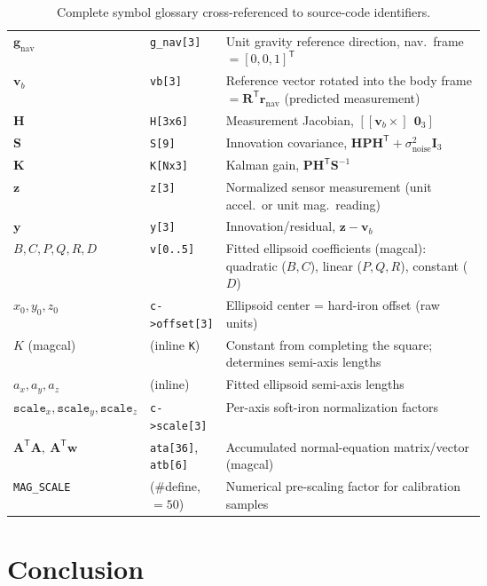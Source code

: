 \documentclass[11pt]{article}
\newcommand{\vect}[1]{\bm{#1}}
\newcommand{\mat}[1]{\bm{#1}}
\newcommand{\transpose}{^{\mathsf{T}}}
\newcommand{\skewm}[1]{\left[#1\times\right]}
\begin{document}
\begin{table}[H]
\begin{tabular}{@{}llp{0.62\linewidth}@{}}
$\vect g_{\text{nav}}$ & \texttt{g\_nav[3]} & Unit gravity reference direction, nav.\ frame $=[0,0,1]\transpose$ \\
$\vect v_b$ & \texttt{vb[3]} & Reference vector rotated into the body frame $=\mat R\transpose\vect r_{\text{nav}}$ (predicted measurement) \\
$\mat H$ & \texttt{H[3x6]} & Measurement Jacobian, $[\skewm{\vect v_b}\ \ \mat 0_3]$ \\
$\mat S$ & \texttt{S[9]} & Innovation covariance, $\mat H\mat P\mat H\transpose + \sigma_{\text{noise}}^2\mat I_3$ \\
$\mat K$ & \texttt{K[Nx3]} & Kalman gain, $\mat P\mat H\transpose\mat S^{-1}$ \\
$\vect z$ & \texttt{z[3]} & Normalized sensor measurement (unit accel.\ or unit mag.\ reading) \\
$\vect y$ & \texttt{y[3]} & Innovation/residual, $\vect z-\vect v_b$ \\
$B,C,P,Q,R,D$ & \texttt{v[0..5]} & Fitted ellipsoid coefficients (magcal): quadratic ($B,C$), linear ($P,Q,R$), constant ($D$) \\
$x_0,y_0,z_0$ & \texttt{c->offset[3]} & Ellipsoid center = hard-iron offset (raw units) \\
$K$ (magcal) & (inline \texttt{K}) & Constant from completing the square; determines semi-axis lengths \\
$a_x,a_y,a_z$ & (inline) & Fitted ellipsoid semi-axis lengths \\
$\texttt{scale}_x,\texttt{scale}_y,\texttt{scale}_z$ & \texttt{c->scale[3]} & Per-axis soft-iron normalization factors \\
$\mat A\transpose\mat A,\ \mat A\transpose\vect w$ & \texttt{ata[36]}, \texttt{atb[6]} & Accumulated normal-equation matrix/vector (magcal) \\
\texttt{MAG\_SCALE} & (\#define, $=50$) & Numerical pre-scaling factor for calibration samples \\
\bottomrule
\end{tabular}
\caption{Complete symbol glossary cross-referenced to source-code identifiers.}
\end{table}

\section*{Conclusion}
\end{document}
